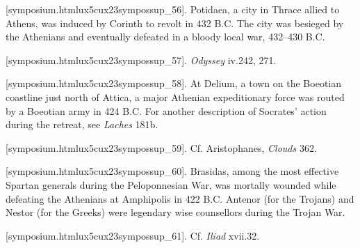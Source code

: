 [symposium.htmlux5cux23sympossup_56]. Potidaea, a city in
Thrace allied to Athens, was induced by Corinth to revolt in 432 B.C.
The city was besieged by the Athenians and eventually defeated in a
bloody local war, 432--430 B.C.

[symposium.htmlux5cux23sympossup_57]. {\em Odyssey} iv.242,
271.

[symposium.htmlux5cux23sympossup_58]. At Delium, a town on the
Boeotian coastline just north of Attica, a major Athenian expeditionary
force was routed by a Boeotian army in 424 B.C. For another description
of Socrates' action during the retreat, see {\em Laches} 181b.

[symposium.htmlux5cux23sympossup_59]. Cf. Aristophanes,
{\em Clouds} 362.

[symposium.htmlux5cux23sympossup_60]. Brasidas, among the most
effective Spartan generals during the Peloponnesian War, was mortally
wounded while defeating the Athenians at Amphipolis in 422 B.C. Antenor
(for the Trojans) and Nestor (for the Greeks) were legendary wise
counsellors during the Trojan War.

[symposium.htmlux5cux23sympossup_61]. Cf. {\em Iliad} xvii.32.
